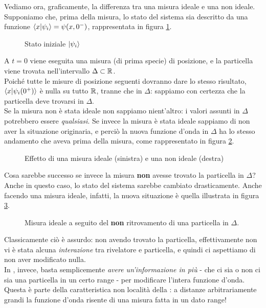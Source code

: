\documentclass[../../FisicaTeorica.tex]{subfiles}
\begin{document}
Vediamo ora, graficamente, la differenza tra una misura ideale e una non ideale.\\
Supponiamo che, prima della misura, lo stato del sistema sia descritto da una funzione $\braket{x|\psi_i} = \psi(x,0^-)$, rappresentata in figura \ref{fig:statoiniziale}.
\begin{figure}[H]
    \centering
    
    \vspace{-2em}
    \caption{Stato iniziale $\ket{\psi_i}$}
    \label{fig:statoiniziale}
\end{figure}
A $t=0$ viene eseguita una misura (di prima specie) di posizione, e la particella viene trovata nell'intervallo $\Delta \subset \mathbb{R}$.\\
Poiché tutte le misure di posizione seguenti dovranno dare lo stesso risultato, $\braket{x|\psi_i(0^+)}$ è nulla su tutto $\mathbb{R}$, tranne che in $\Delta$: sappiamo con certezza che la particella deve trovarsi in $\Delta$.\\
Se la misura non è stata ideale non sappiamo nient'altro: i valori assunti in $\Delta$ potrebbero essere \textit{qualsiasi}. Se invece la misura è stata ideale sappiamo di non aver  la situazione originaria, e perciò la nuova funzione d'onda in $\Delta$ ha lo stesso andamento che aveva prima della misura, come rappresentato in figura \ref{fig:foundparticle}.
\begin{figure}[H]
    \centering
    
    
    \vspace{-3em}
    \caption{Effetto di una misura ideale (sinistra) e una non ideale (destra)}
    \label{fig:foundparticle}
\end{figure}
Cosa sarebbe successo se invece la misura \textbf{non} avesse trovato la particella in $\Delta$?\\
Anche in questo caso, lo stato del sistema sarebbe cambiato drasticamente. Anche facendo una misura ideale, infatti, la nuova situazione è quella illustrata in figura \ref{fig:notfoundparticle}.
\begin{figure}[H]
    \centering
    
    \vspace{-2em}
    \caption{Misura ideale a seguito del \textbf{non} ritrovamento di una particella in $\Delta$.}
    \label{fig:notfoundparticle}
\end{figure}
Classicamente ciò è assurdo: non avendo trovato la particella, effettivamente non vi è stata alcuna \textit{interazione} tra rivelatore e particella, e quindi ci aspettiamo di non aver modificato nulla.\\
In \MQ, invece, basta semplicemente \textit{avere un'informazione in più} - che ci sia o non ci sia una particella in un certo range - per modificare l'intera funzione d'onda.\\
Questa è parte della caratteristica non località della \MQ: a distanze arbitrariamente grandi la funzione d'onda risente di una misura fatta in un dato range!
\end{document}
